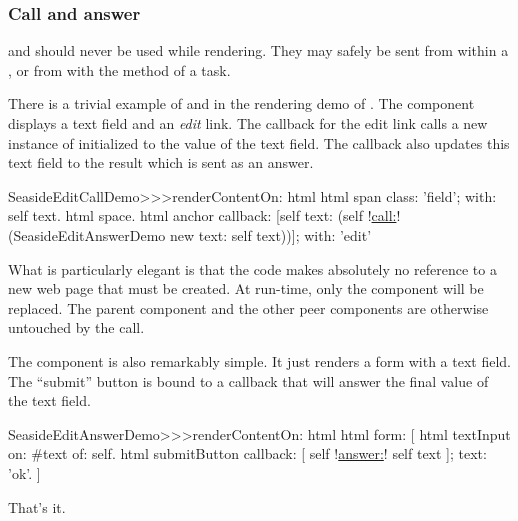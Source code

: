 \documentclass[a4paper,10pt,twoside]{book}
\begin{document}
\subsubsection{Call and answer}



 and  should never be used while rendering.
They may safely be sent from within a , or from with the  method of a task.

There is a trivial example of  and  in the rendering demo of .
The component  displays a text field and an \emph{edit} link.
The callback for the edit link calls a new instance of  initialized to the value of the text field.
The callback also updates this text field to the result which is sent as an answer.

\begin{code}{}
SeasideEditCallDemo>>>renderContentOn: html 
	html span
		class: 'field';
		with: self text.
	html space.
	html anchor
		callback: [self text: (self !\underline{call:}! (SeasideEditAnswerDemo new text: self text))];
		with: 'edit'
\end{code}{}

What is particularly elegant is that the code makes absolutely no reference to a new web page that must be created.
At run-time, only the  component will be replaced.
The parent component and the other peer components are otherwise untouched by the call.

The  component is also remarkably simple.
It just renders a form with a text field.
The ``submit'' button is bound to a callback that will answer the final value of the text field.

\begin{code}{}
SeasideEditAnswerDemo>>>renderContentOn: html
	html form: [
		html textInput
			on: #text of: self.
		html submitButton
			callback: [ self !\underline{answer:}! self text ];
			text: 'ok'.
		]
\end{code}{}


That's it.
\end{document}
